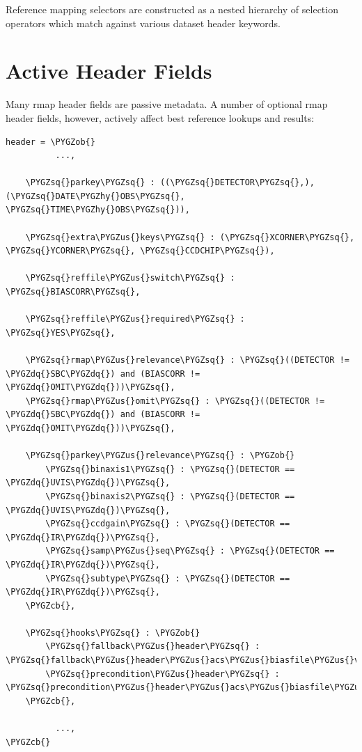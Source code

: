 \documentclass[letterpaper,10pt,english]{sphinxmanual}
\def\PYGZus{\char`\_}
\def\PYGZob{\char`\{}
\def\PYGZcb{\char`\}}
\def\PYGZhy{\char`\-}
\def\PYGZsq{\char`\'}
\def\PYGZdq{\char`\"}
\renewcommand\PYGZsq{\textquotesingle}
\begin{document}
Reference mapping selectors are constructed as a nested hierarchy of selection operators which match against
various dataset header keywords.


\section{Active Header Fields}
\label{rmap_syntax:active-header-fields}
Many rmap header fields are passive metadata.   A number of optional rmap header fields,  however,  actively affect
best reference lookups and results:

\begin{Verbatim}[commandchars=\\\{\}]
header = \PYGZob{}
          ...,

    \PYGZsq{}parkey\PYGZsq{} : ((\PYGZsq{}DETECTOR\PYGZsq{},), (\PYGZsq{}DATE\PYGZhy{}OBS\PYGZsq{}, \PYGZsq{}TIME\PYGZhy{}OBS\PYGZsq{})),

    \PYGZsq{}extra\PYGZus{}keys\PYGZsq{} : (\PYGZsq{}XCORNER\PYGZsq{}, \PYGZsq{}YCORNER\PYGZsq{}, \PYGZsq{}CCDCHIP\PYGZsq{}),

    \PYGZsq{}reffile\PYGZus{}switch\PYGZsq{} : \PYGZsq{}BIASCORR\PYGZsq{},

    \PYGZsq{}reffile\PYGZus{}required\PYGZsq{} : \PYGZsq{}YES\PYGZsq{},

    \PYGZsq{}rmap\PYGZus{}relevance\PYGZsq{} : \PYGZsq{}((DETECTOR != \PYGZdq{}SBC\PYGZdq{}) and (BIASCORR != \PYGZdq{}OMIT\PYGZdq{}))\PYGZsq{},
    \PYGZsq{}rmap\PYGZus{}omit\PYGZsq{} : \PYGZsq{}((DETECTOR != \PYGZdq{}SBC\PYGZdq{}) and (BIASCORR != \PYGZdq{}OMIT\PYGZdq{}))\PYGZsq{},

    \PYGZsq{}parkey\PYGZus{}relevance\PYGZsq{} : \PYGZob{}
        \PYGZsq{}binaxis1\PYGZsq{} : \PYGZsq{}(DETECTOR == \PYGZdq{}UVIS\PYGZdq{})\PYGZsq{},
        \PYGZsq{}binaxis2\PYGZsq{} : \PYGZsq{}(DETECTOR == \PYGZdq{}UVIS\PYGZdq{})\PYGZsq{},
        \PYGZsq{}ccdgain\PYGZsq{} : \PYGZsq{}(DETECTOR == \PYGZdq{}IR\PYGZdq{})\PYGZsq{},
        \PYGZsq{}samp\PYGZus{}seq\PYGZsq{} : \PYGZsq{}(DETECTOR == \PYGZdq{}IR\PYGZdq{})\PYGZsq{},
        \PYGZsq{}subtype\PYGZsq{} : \PYGZsq{}(DETECTOR == \PYGZdq{}IR\PYGZdq{})\PYGZsq{},
    \PYGZcb{},

    \PYGZsq{}hooks\PYGZsq{} : \PYGZob{}
        \PYGZsq{}fallback\PYGZus{}header\PYGZsq{} : \PYGZsq{}fallback\PYGZus{}header\PYGZus{}acs\PYGZus{}biasfile\PYGZus{}v2\PYGZsq{},
        \PYGZsq{}precondition\PYGZus{}header\PYGZsq{} : \PYGZsq{}precondition\PYGZus{}header\PYGZus{}acs\PYGZus{}biasfile\PYGZus{}v2\PYGZsq{},
    \PYGZcb{},

          ...,
\PYGZcb{}
\end{Verbatim}
\end{document}
